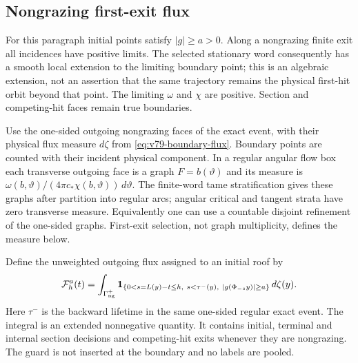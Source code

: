 \subsection{Nongrazing first-exit flux}
For this paragraph initial points satisfy $|g|\ge a>0$. Along a
nongrazing finite exit all incidences have positive limits. The
selected stationary word consequently has a smooth local extension
to the limiting boundary point; this is an algebraic extension, not
an assertion that the same trajectory remains the physical first-hit
orbit beyond that point. The limiting $\omega$ and $\chi$ are
positive. Section and competing-hit faces remain true boundaries.

Use the one-sided outgoing nongrazing faces of the exact event,
with their physical flux measure $d\zeta$ from
\eqref{eq:v79-boundary-flux}. Boundary points are counted with their
incident physical component. In a regular angular flow box each
transverse outgoing face is a graph $F=b(\vartheta)$ and its measure
is $\omega(b,\vartheta)/(4\pi c_*\chi(b,\vartheta))\,d\vartheta$.
The finite-word tame stratification gives these graphs after
partition into regular arcs; angular critical and tangent strata
have zero transverse measure. Equivalently one can use a countable
disjoint refinement of the one-sided graphs. First-exit selection,
not graph multiplicity, defines the measure below.

Define the unweighted outgoing flux assigned to an initial roof by
\begin{equation}\label{eq:v80-outgoing-assignment}
 \mathcal F_h^a(t)=\int_{\Gamma_{\rm ng}^+}
 \one_{\{0<s=L(y)-t\le h,\ s<\tau^-(y),\ |g(\Phi_{-s}y)|\ge a\}}
                                                 \,d\zeta(y).
\end{equation}
Here $\tau^-$ is the backward lifetime in the same one-sided regular
exact event. The integral is an extended nonnegative quantity.
It contains initial, terminal and internal section decisions and
competing-hit exits whenever they are nongrazing. The guard is not
inserted at the boundary and no labels are pooled.


